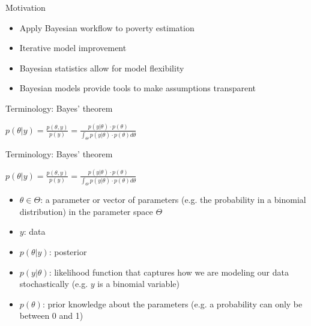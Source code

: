 \begin{frame}{Motivation}

\begin{itemize}
    \item Apply Bayesian workflow to poverty estimation \cite{gelman_bayesian_2020}
    \item Iterative model improvement
    \item Bayesian statistics allow for model flexibility
    \item Bayesian models provide tools to make assumptions transparent
\end{itemize}

\end{frame}


\begin{frame}{Terminology: Bayes' theorem}
    \begin{center}
        $p(\theta|y) = \displaystyle \frac{p(\theta, y)}{p(y)} = \displaystyle \frac{p(y|\theta) \cdot p(\theta)}{\int_\Theta p(y|\theta) \cdot p(\theta) d\theta}$\\
    \end{center}

\end{frame}

\begin{frame}{Terminology: Bayes' theorem}
    \begin{center}
        $p(\theta|y) = \displaystyle \frac{p(\theta, y)}{p(y)} = \displaystyle \frac{p(y|\theta) \cdot p(\theta)}{\int_\Theta p(y|\theta) \cdot p(\theta) d\theta}$\\
    \end{center}

    \begin{itemize}


        \item
        $\theta \in \Theta$: a parameter or vector of parameters (e.g. the probability in a binomial distribution) in the parameter space $\Theta$

        \item
        $y$: data

        \item
        $p(\theta|y)$: posterior

        \item
        $p(y|\theta)$: likelihood function that captures how we are modeling our data stochastically (e.g. $y$ is a binomial variable)

        \item
        $p(\theta)$: prior knowledge about the parameters (e.g. a probability can only be between 0 and 1)



    \end{itemize}
\end{frame}



